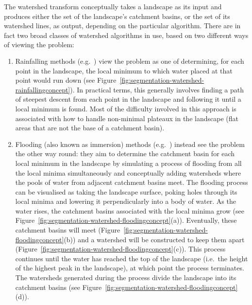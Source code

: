 The watershed transform conceptually takes a landscape as its input and produces either the set of the landscape's catchment basins, or the set of its watershed lines, as output, depending on the particular algorithm. There are in fact two broad classes of watershed algorithms in use, based on two different ways of viewing the problem:
%
\begin{enumerate}

\item Rainfalling methods (e.g.~\cite{meijster98,osma-ruiz06,stoev00}) view the problem as one of determining, for each point in the landscape, the local minimum to which water placed at that point would run down (see Figure~\ref{fig:segmentation-watershed-rainfallingconcept}). In practical terms, this generally involves finding a path of steepest descent from each point in the landscape and following it until a local minimum is found. Most of the difficulty involved in this approach is associated with how to handle non-minimal plateaux in the landscape (flat areas that are not the base of a catchment basin).

\item Flooding (also known as immersion) methods (e.g.~\cite{bieniek00,rambabu07}) instead see the problem the other way round: they aim to determine the catchment basin for each local minimum in the landscape by simulating a process of flooding from all the local minima simultaneously and conceptually adding watersheds where the pools of water from adjacent catchment basins meet. The flooding process can be visualised as taking the landscape surface, poking holes through its local minima and lowering it perpendicularly into a body of water. As the water rises, the catchment basins associated with the local minima grow (see Figure~\ref{fig:segmentation-watershed-floodingconcept}(a)). Eventually, these catchment basins will meet (Figure~\ref{fig:segmentation-watershed-floodingconcept}(b)) and a watershed will be constructed to keep them apart (Figure~\ref{fig:segmentation-watershed-floodingconcept}(c)). This process continues until the water has reached the top of the landscape (i.e.~the height of the highest peak in the landscape), at which point the process terminates. The watersheds generated during the process divide the landscape into its catchment basins (see Figure~\ref{fig:segmentation-watershed-floodingconcept}(d)).

\end{enumerate}

